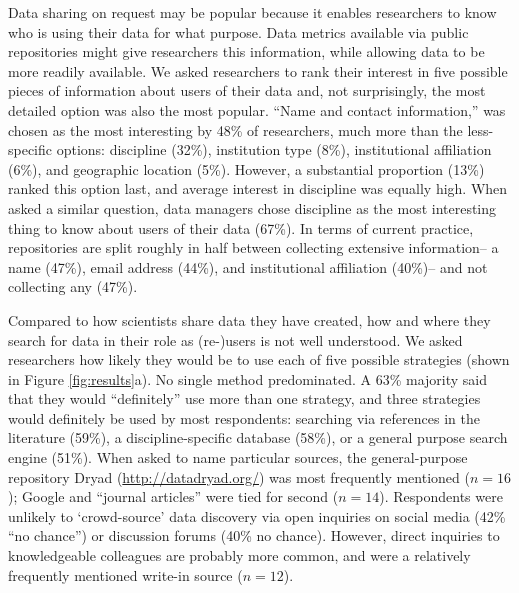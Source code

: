 \documentclass[english]{article}
\begin{document}

Data sharing on request may be popular because it enables researchers to know who is using their data for what purpose.
Data metrics available via public repositories might give researchers this information, while allowing data to be more readily available.
We asked researchers to rank their interest in five possible pieces of information about users of their data and, not surprisingly, the most detailed option was also the most popular.
``Name and contact information,'' was chosen as the most interesting by 48\% of researchers, much more than the less-specific options: discipline (32\%), institution type (8\%), institutional affiliation (6\%), and geographic location (5\%).
However, a substantial proportion (13\%) ranked this option last, and average interest in discipline was equally high.
When asked a similar question, data managers chose discipline as the most interesting thing to know about users of their data (67\%).
In terms of current practice, repositories are split roughly in half between collecting extensive information-- a name (47\%), email address (44\%), and institutional affiliation (40\%)-- and not collecting any (47\%).



Compared to how scientists share data they have created, how and where they search for data in their role as (re-)users is not well understood.
We asked researchers how likely they would be to use each of five possible strategies (shown in Figure \ref{fig:results}a).
No single method predominated.
A 63\% majority said that they would ``definitely'' use more than one strategy, and three strategies would definitely be used by most respondents: searching via references in the literature (59\%), a discipline-specific database (58\%), or a general purpose search engine (51\%). 
When asked to name particular sources, the general-purpose repository Dryad (\url{http://datadryad.org/}) was most frequently mentioned ($n=16$); Google and ``journal articles'' were tied for second ($n=14$). 
Respondents were unlikely to `crowd-source' data discovery via open inquiries on social media (42\% ``no chance'') or discussion forums (40\% no chance).
However, direct inquiries to knowledgeable colleagues are probably more common, and were a relatively frequently mentioned write-in source ($n=12$).
\end{document}
